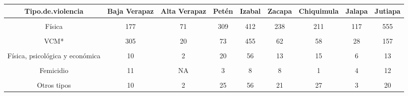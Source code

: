 \begin{tabular}[t]{ccccccccc}
\toprule
\textbf{Tipo.de.violencia} & \textbf{Baja Verapaz} & \textbf{Alta Verapaz} & \textbf{Petén} & \textbf{Izabal} & \textbf{Zacapa} & \textbf{Chiquimula} & \textbf{Jalapa} & \textbf{Jutiapa}\\
\midrule
\cellcolor[HTML]{B6B3FF}{Psicológica} & \cellcolor[HTML]{B6B3FF}{877} & \cellcolor[HTML]{B6B3FF}{14} & \cellcolor[HTML]{B6B3FF}{630} & \cellcolor[HTML]{B6B3FF}{1631} & \cellcolor[HTML]{B6B3FF}{426} & \cellcolor[HTML]{B6B3FF}{408} & \cellcolor[HTML]{B6B3FF}{125} & \cellcolor[HTML]{B6B3FF}{757}\\
Física & 177 & 71 & 309 & 412 & 238 & 211 & 117 & 555\\
\cellcolor[HTML]{B6B3FF}{Física y psicológica} & \cellcolor[HTML]{B6B3FF}{399} & \cellcolor[HTML]{B6B3FF}{0} & \cellcolor[HTML]{B6B3FF}{314} & \cellcolor[HTML]{B6B3FF}{1014} & \cellcolor[HTML]{B6B3FF}{267} & \cellcolor[HTML]{B6B3FF}{158} & \cellcolor[HTML]{B6B3FF}{84} & \cellcolor[HTML]{B6B3FF}{599}\\
VCM* & 305 & 20 & 73 & 455 & 62 & 58 & 28 & 157\\
\cellcolor[HTML]{B6B3FF}{Psicológica y económica} & \cellcolor[HTML]{B6B3FF}{22} & \cellcolor[HTML]{B6B3FF}{1} & \cellcolor[HTML]{B6B3FF}{19} & \cellcolor[HTML]{B6B3FF}{49} & \cellcolor[HTML]{B6B3FF}{14} & \cellcolor[HTML]{B6B3FF}{10} & \cellcolor[HTML]{B6B3FF}{5} & \cellcolor[HTML]{B6B3FF}{32}\\
Física, psicológica y económica & 10 & 2 & 20 & 56 & 13 & 15 & 6 & 13\\
\cellcolor[HTML]{B6B3FF}{VCM y económica} & \cellcolor[HTML]{B6B3FF}{3} & \cellcolor[HTML]{B6B3FF}{3} & \cellcolor[HTML]{B6B3FF}{12} & \cellcolor[HTML]{B6B3FF}{9} & \cellcolor[HTML]{B6B3FF}{3} & \cellcolor[HTML]{B6B3FF}{3} & \cellcolor[HTML]{B6B3FF}{4} & \cellcolor[HTML]{B6B3FF}{16}\\
Femicidio & 11 & NA & 3 & 8 & 8 & 1 & 4 & 12\\
\cellcolor[HTML]{B6B3FF}{Física y económica} & \cellcolor[HTML]{B6B3FF}{NA} & \cellcolor[HTML]{B6B3FF}{NA} & \cellcolor[HTML]{B6B3FF}{6} & \cellcolor[HTML]{B6B3FF}{10} & \cellcolor[HTML]{B6B3FF}{8} & \cellcolor[HTML]{B6B3FF}{5} & \cellcolor[HTML]{B6B3FF}{2} & \cellcolor[HTML]{B6B3FF}{9}\\
Otros tipos & 10 & 2 & 25 & 56 & 21 & 27 & 3 & 20\\
\bottomrule
\end{tabular}
